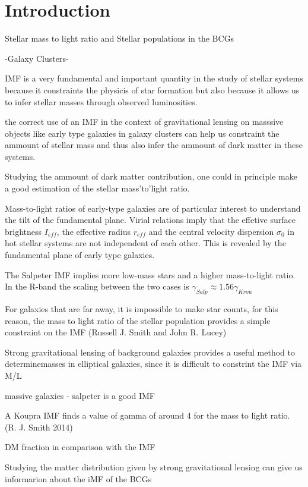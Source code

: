 \chapter{Introduction}

Stellar mass to light ratio and Stellar populations in the BCGs

-Galaxy Clusters-

IMF is a very fundamental and important quantity in the study of stellar systems because it constraints the physicis of star formation but also because it allows us to infer stellar masses through observed luminosities.

the correct use of an IMF in the context of gravitational lensing on masssive objects like early type galaxies in galaxy clusters can help us constraint the ammount of stellar mass and thus also infer the ammount of dark matter in these systems.

Studying the ammount of dark matter contribution, one could in principle make a good estimation of the stellar mass'to'light ratio.

Mass-to-light ratios of early-type galaxies are of particular interest to understand the tilt of the fundamental plane. Virial relations imply that the effetive surface brightness $I_{eff}$, the effective radius $r_{eff}$ and the central velocity dispersion $\sigma_{0}$ in hot stellar systems are not independent of each other. This is revealed by the fundamental plane of early type galaxies.

The Salpeter IMF implies more low-mass stars and a higher mass-to-light ratio. In the R-band the scaling between the two cases is $\gamma_{Salp}\approx 1.56\gamma_{Krou}$

For galaxies that are far away, it is impossible to make star counts, for this reason, the mass to light ratio of the stellar population provides a simple constraint on the IMF (Russell J. Smith and John R. Lucey) 

Strong gravitational lensing of background galaxies provides a useful method to determinemasses in elliptical galaxies, since it is difficult to constrint the IMF via M/L

massive galaxies - salpeter is a good IMF

A Koupra IMF finds a value of gamma of around 4 for the mass to light ratio. (R. J. Smith 2014) 

DM fraction in comparison with the IMF 

Studying the matter distribution given by strong gravitational lensing can give us informarion about the iMF of the BCGs

